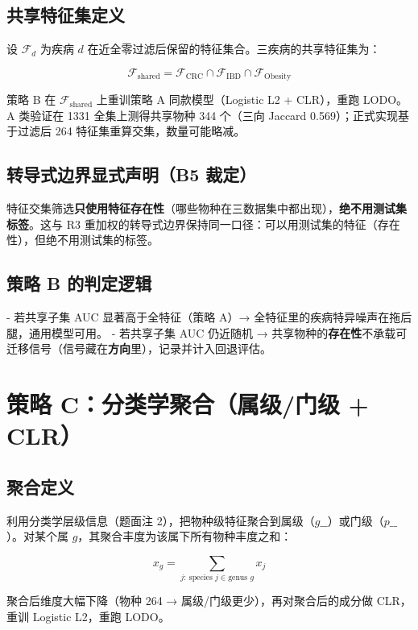 \documentclass{internal-report}
\begin{document}
\subsection{共享特征集定义}

设 $\mathcal{F}_d$ 为疾病 $d$ 在近全零过滤后保留的特征集合。三疾病的共享特征集为：

$$
\mathcal{F}_{\text{shared}} = \mathcal{F}_{\text{CRC}} \cap \mathcal{F}_{\text{IBD}} \cap \mathcal{F}_{\text{Obesity}}
$$

策略 B 在 $\mathcal{F}_{\text{shared}}$ 上重训策略 A 同款模型（Logistic L2 + CLR），重跑 LODO。A 类验证在 1331 全集上测得共享物种 344 个（三向 Jaccard 0.569）；正式实现基于过滤后 264 特征集重算交集，数量可能略减。

\subsection{转导式边界显式声明（B5 裁定）}

特征交集筛选\textbf{只使用特征存在性}（哪些物种在三数据集中都出现），\textbf{绝不用测试集标签}。这与 R3 重加权的转导式边界保持同一口径：可以用测试集的特征（存在性），但绝不用测试集的标签。

\subsection{策略 B 的判定逻辑}

- 若共享子集 AUC 显著高于全特征（策略 A）→ 全特征里的疾病特异噪声在拖后腿，通用模型可用。
- 若共享子集 AUC 仍近随机 → 共享物种的\textbf{存在性}不承载可迁移信号（信号藏在\textbf{方向}里），记录并计入回退评估。

\section{策略 C：分类学聚合（属级/门级 + CLR）}

\subsection{聚合定义}

利用分类学层级信息（题面注 2），把物种级特征聚合到属级（$g\_\_$）或门级（$p\_\_$）。对某个属 $g$，其聚合丰度为该属下所有物种丰度之和：

$$
x_g = \sum_{j:\ \text{species } j \in \text{genus } g} x_j
$$

聚合后维度大幅下降（物种 264 → 属级/门级更少），再对聚合后的成分做 CLR，重训 Logistic L2，重跑 LODO。
\end{document}
